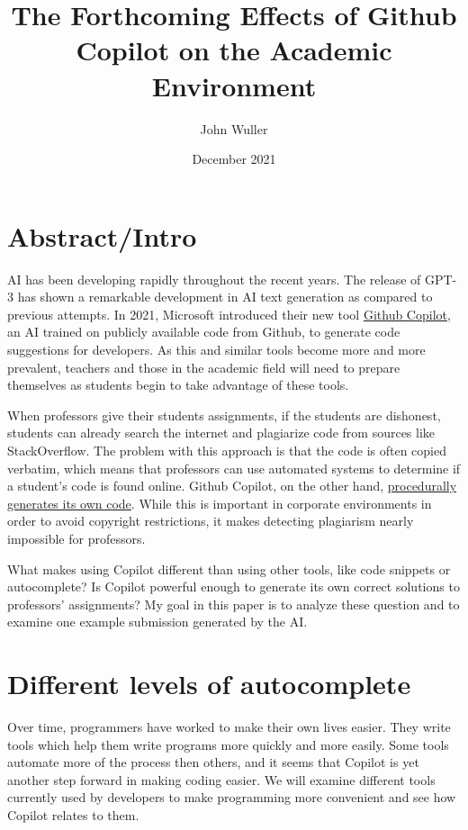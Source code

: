 \documentclass[12pt]{article}
\title{The Forthcoming Effects of Github Copilot on the Academic Environment}
\author{John Wuller}
\date{December 2021}
\begin{document}
\hypertarget{abstractintro}{%
\section{Abstract/Intro}\label{abstractintro}}

AI has been developing rapidly throughout the recent years. The release
of GPT-3 has shown a remarkable development in AI text generation as
compared to previous attempts. In 2021, Microsoft introduced their new
tool
\href{https://github.blog/2021-06-29-introducing-github-copilot-ai-pair-programmer/}{Github
Copilot}, an AI trained on publicly available code from Github, to
generate code suggestions for developers. As this and similar tools
become more and more prevalent, teachers and those in the academic field
will need to prepare themselves as students begin to take advantage of
these tools.

When professors give their students assignments, if the students are
dishonest, students can already search the internet and plagiarize code
from sources like StackOverflow. The problem with this approach is that
the code is often copied verbatim, which means that professors can use
automated systems to determine if a student's code is found online.
Github Copilot, on the other hand,
\href{https://copilot.github.com/\#faq-does-github-copilot-recite-code-from-the-training-set}{procedurally
generates its own code}. While this is important in corporate
environments in order to avoid copyright restrictions, it makes
detecting plagiarism nearly impossible for professors.

What makes using Copilot different than using other tools, like code
snippets or autocomplete? Is Copilot powerful enough to generate its own
correct solutions to professors' assignments? My goal in this paper is
to analyze these question and to examine one example submission
generated by the AI.

\hypertarget{different-levels-of-autocomplete}{%
\section{Different levels of
autocomplete}\label{different-levels-of-autocomplete}}

Over time, programmers have worked to make their own lives easier. They
write tools which help them write programs more quickly and more easily.
Some tools automate more of the process then others, and it seems that
Copilot is yet another step forward in making coding easier. We will
examine different tools currently used by developers to make programming
more convenient and see how Copilot relates to them.
\end{document}
